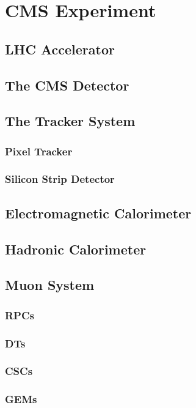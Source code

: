 \chapter[CMS Experiment]{CMS Experiment}
\label{chap:CMSExp}

\section{LHC Accelerator}
\label{sec:LHC}

\section{The CMS Detector}
\label{sec:CMS}

\section{The Tracker System}
\label{sec:Tracker}

\subsection{Pixel Tracker}
\label{subsec:Pixel}

\subsection{Silicon Strip Detector}
\label{subsec:Strip}

\section{Electromagnetic Calorimeter}
\label{sec:ECal}

\section{Hadronic Calorimeter}
\label{sec:HCal}

\section{Muon System}
\label{sec:MuonSys}

\subsection{RPCs}
\label{subsec:RPCs}

\subsection{DTs}
\label{subsec:DTs}

\subsection{CSCs}
\label{subsec:CSCs}

\subsection{GEMs}
\label{subsec:GEMs}

